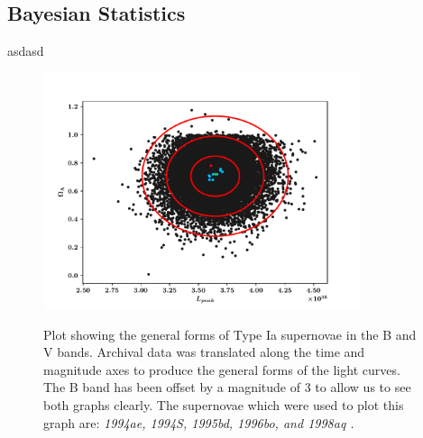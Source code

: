 \documentclass[twocolumn]{revtex4}
\begin{document}
{\vspace{-3ex}
\subsection{Bayesian Statistics} 
\vspace{-2ex}

asdasd

\begin{figure}[!h]
\begin{center}
\includegraphics[width=9.25cm]{results/ol_lp_complete}
\caption[]{Plot showing the general forms of Type Ia supernovae in the B and V bands. Archival data was translated along the time and magnitude axes to produce the general forms of the light curves. The B band has been offset by a magnitude of $3$ to allow us to see both graphs clearly. The supernovae which were used to plot this graph are: \em{1994ae, 1994S, 1995bd, 1996bo, }\em  and \em{1998aq }\em \cite{jha, matheson}. }
\vspace{-3ex}
\label{fig:ol_lp_complete}
\end{center}
\end{figure}




}
\end{document}
